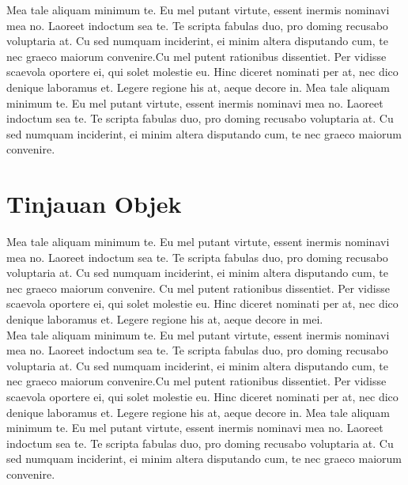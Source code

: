 Mea tale aliquam minimum te. Eu mel putant virtute, essent inermis nominavi mea no. Laoreet indoctum sea te. Te scripta fabulas duo, pro doming recusabo voluptaria at. Cu sed numquam inciderint, ei minim altera disputando cum, te nec graeco maiorum convenire.Cu mel putent rationibus dissentiet. Per vidisse scaevola oportere ei, qui solet molestie eu. Hinc diceret nominati per at, nec dico denique laboramus et. Legere regione his at, aeque decore in. Mea tale aliquam minimum te. Eu mel putant virtute, essent inermis nominavi mea no. Laoreet indoctum sea te. Te scripta fabulas duo, pro doming recusabo voluptaria at. Cu sed numquam inciderint, ei minim altera disputando cum, te nec graeco maiorum convenire.\\

\section{Tinjauan Objek}
Mea tale aliquam minimum te. Eu mel putant virtute, essent inermis nominavi mea no. Laoreet indoctum sea te. Te scripta fabulas duo, pro doming recusabo voluptaria at. Cu sed numquam inciderint, ei minim altera disputando cum, te nec graeco maiorum convenire. Cu mel putent rationibus dissentiet. Per vidisse scaevola oportere ei, qui solet molestie eu. Hinc diceret nominati per at, nec dico denique laboramus et. Legere regione his at, aeque decore in mei.\\

Mea tale aliquam minimum te. Eu mel putant virtute, essent inermis nominavi mea no. Laoreet indoctum sea te. Te scripta fabulas duo, pro doming recusabo voluptaria at. Cu sed numquam inciderint, ei minim altera disputando cum, te nec graeco maiorum convenire.Cu mel putent rationibus dissentiet. Per vidisse scaevola oportere ei, qui solet molestie eu. Hinc diceret nominati per at, nec dico denique laboramus et. Legere regione his at, aeque decore in. Mea tale aliquam minimum te. Eu mel putant virtute, essent inermis nominavi mea no. Laoreet indoctum sea te. Te scripta fabulas duo, pro doming recusabo voluptaria at. Cu sed numquam inciderint, ei minim altera disputando cum, te nec graeco maiorum convenire.\\